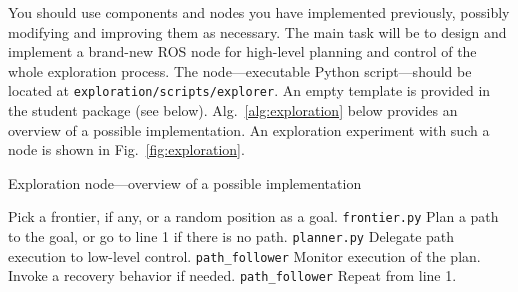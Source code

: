 \documentclass[a4paper]{article}
\newcommand{\file}[1]{\texttt{#1}}
\begin{document}
You should use components and nodes you have implemented previously, possibly modifying and improving them as necessary.
The main task will be to design and implement a brand-new ROS node for high-level planning and control of the whole exploration process.
The node---executable Python script---should be located at \file{exploration/scripts/explorer}.
An empty template is provided in the student package (see below).
Alg.~\ref{alg:exploration} below provides an overview of a possible implementation.
An exploration experiment with such a node is shown in Fig.~\ref{fig:exploration}.

\begin{algorithm}[tb]
\caption{Exploration node---overview of a possible implementation}
\begin{algorithmic}[1]
\State Pick a frontier, if any, or a random position as a goal. \Comment \file{frontier.py}
\State Plan a path to the goal, or go to line 1 if there is no path. \Comment \file{planner.py}
\State Delegate path execution to low-level control. \Comment \file{path_follower}
\State Monitor execution of the plan.
\State Invoke a recovery behavior if needed. \Comment \file{path_follower}
\State Repeat from line 1.
\end{algorithmic}
\label{alg:exploration}
\end{algorithm}
\end{document}

